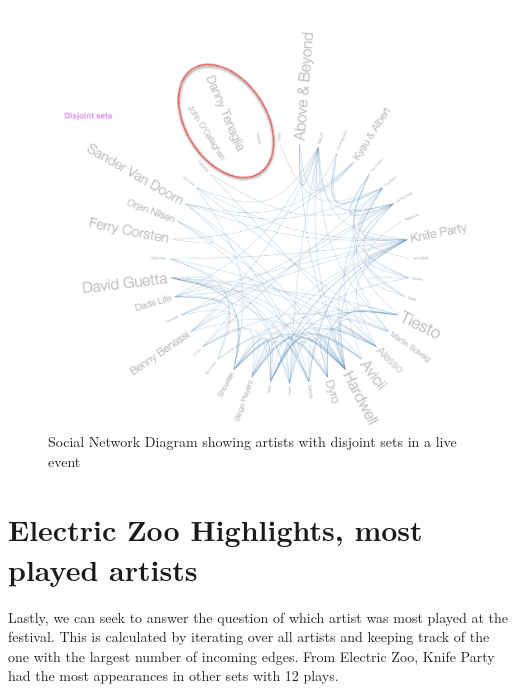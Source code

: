 \documentclass[12pt]{dalcsthesis}
\begin{document}
\begin{figure}[h]
\includegraphics[scale=.5]{disjoint_sets}
\centering
\caption{Social Network Diagram showing artists with disjoint sets in a live event }
\end{figure}

\section{Electric Zoo Highlights, most played artists}

Lastly, we can seek to answer the question of which artist was most played at the festival. This is calculated by iterating over all artists and keeping track of the one with the largest number of incoming edges. From Electric Zoo, Knife Party had the most appearances in other sets with 12 plays.  \newpage
\end{document}
